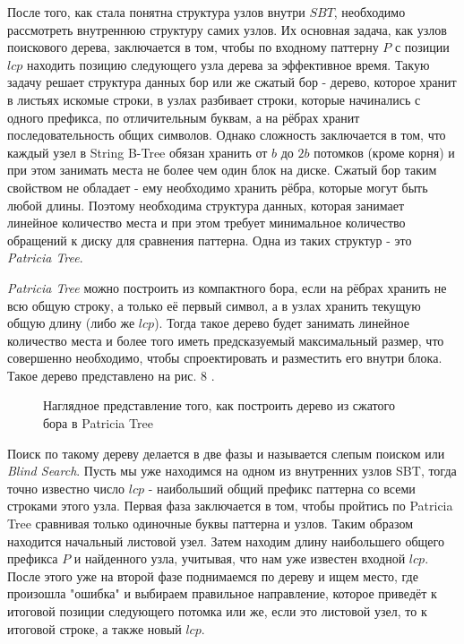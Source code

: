 \documentclass[a4paper,12pt]{article}
\begin{document}
После того, как стала понятна структура узлов внутри $SBT$, необходимо рассмотреть внутреннюю структуру самих узлов. Их основная задача, как узлов поискового дерева, заключается в том, чтобы по входному паттерну $P$ с позиции $lcp$ находить позицию следующего узла дерева за эффективное время. Такую задачу решает структура данных бор или же сжатый бор - дерево, которое хранит в листьях искомые строки, в узлах разбивает строки, которые начинались с одного префикса, по отличительным буквам, а на рёбрах хранит последовательность общих символов. Однако сложность заключается в том, что каждый узел в String B-Tree обязан хранить от $b$ до $2b$ потомков (кроме корня) и при этом занимать места не более чем один блок на диске. Сжатый бор таким свойством не обладает - ему необходимо хранить рёбра, которые могут быть любой длины. Поэтому необходима структура данных, которая занимает линейное количество места и при этом требует минимальное количество обращений к диску для сравнения паттерна. Одна из таких структур - это \textit{Patricia Tree}.

\textit{Patricia Tree} можно построить из компактного бора, если на рёбрах хранить не всю общую строку, а только её первый символ, а в узлах хранить текущую общую длину (либо же $lcp$). Тогда такое дерево будет занимать линейное количество места и более того иметь предсказуемый максимальный размер, что совершенно необходимо, чтобы спроектировать и разместить его внутри блока. Такое дерево представлено на рис. 8 \cite{ferragina1999string}.

\begin{figure}[h!]
\caption{Наглядное представление того, как построить дерево из сжатого бора в Patricia Tree}
\end{figure}

Поиск по такому дереву делается в две фазы и называется слепым поиском или \textit{Blind Search}. Пусть мы уже находимся на одном из внутренних узлов SBT, тогда точно известно число $lcp$ - наибольший общий префикс паттерна со всеми строками этого узла. Первая фаза заключается в том, чтобы пройтись по Patricia Tree сравнивая только одиночные буквы паттерна и узлов. Таким образом находится начальный листовой узел. Затем находим длину наибольшего общего префикса $P$ и найденного узла, учитывая, что нам уже известен входной $lcp$. После этого уже на второй фазе поднимаемся по дереву и ищем место, где произошла "ошибка" и выбираем правильное направление, которое приведёт к итоговой позиции следующего потомка или же, если это листовой узел, то к итоговой строке, а также новый $lcp$.
\end{document}
